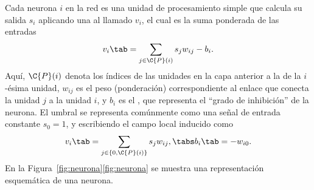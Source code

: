 Cada neurona $i$ en la red es una unidad de procesamiento simple que
calcula su salida $s_i$ aplicando una  al
llamado  $v_i$, el cual es la suma ponderada de
las entradas
%
\begin{align}
  v_i \tab= \sum_{j\in\C{P}(i)} s_j w_{ij} - b_i .
\end{align}
%
Aquí, $\C{P}(i)$ denota los índices de las unidades en la capa
anterior a la de la $i$-ésima unidad, $w_{ij}$ es el peso
(ponderación) correspondiente al enlace que conecta la unidad $j$ a la
unidad $i$, y $b_i$ es el , que representa el ``grado de
inhibición'' de la neurona. El umbral se representa comúnmente
como una señal de entrada constante $s_0=1$, y escribiendo
el campo local inducido como
%
\begin{align}
  v_i \tab= \sum_{j\in\{0,\C{P}(i)\}} s_j w_{ij}, \tabs b_i\tab=-w_{i0}.
\end{align}
%
En la
\iflatexml{}Figura~\ref{fig:neurona}\else\autoref{fig:neurona}\fi
se muestra una representación esquemática de una neurona.
